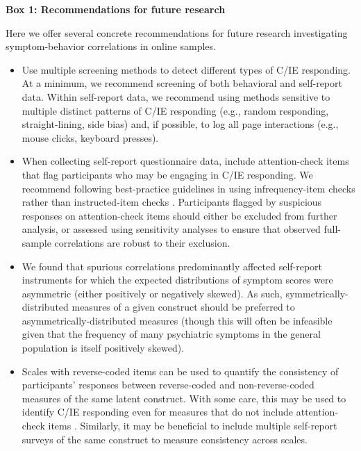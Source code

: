 \documentclass[a4paper,notitlepage,12pt]{article}
\begin{document}
\begin{refsection}[main]
\newpage
\textbf{Box 1: Recommendations for future research}

Here we offer several concrete recommendations for future research investigating symptom-behavior correlations in online samples.

\begin{itemize}

    \item Use multiple screening methods to detect different types of C/IE responding. At a minimum, we recommend screening of both behavioral and self-report data. Within self-report data, we recommend using methods sensitive to multiple distinct patterns of C/IE responding (e.g., random responding, straight-lining, side bias) and, if possible, to log all page interactions (e.g., mouse clicks, keyboard presses).

    \item When collecting self-report questionnaire data, include attention-check items that flag participants who may be engaging in C/IE responding. We recommend following best-practice guidelines in using infrequency-item checks rather than instructed-item checks \cite{barends2019noncompliant, thomas2017validity, hauser2016attentive}. Participants flagged by suspicious responses on attention-check items should either be excluded from further analysis, or assessed using sensitivity analyses to ensure that observed full-sample correlations are robust to their exclusion.

    \item We found that spurious correlations predominantly affected self-report instruments for which the expected distributions of symptom scores were asymmetric (either positively or negatively skewed). As such, symmetrically-distributed measures of a given construct should be preferred to asymmetrically-distributed measures (though this will often be infeasible given that the frequency of many psychiatric symptoms in the general population is itself positively skewed).
    
    \item Scales with reverse-coded items can be used to quantify the consistency of participants' responses between reverse-coded and non-reverse-coded measures of the same latent construct. With some care, this may be used to identify C/IE responding even for measures that do not include attention-check items \cite{emons2009detection}. Similarly, it may be beneficial to include multiple self-report surveys of the same construct to measure consistency across scales.
    

\end{itemize}
\end{refsection}
\end{document}

